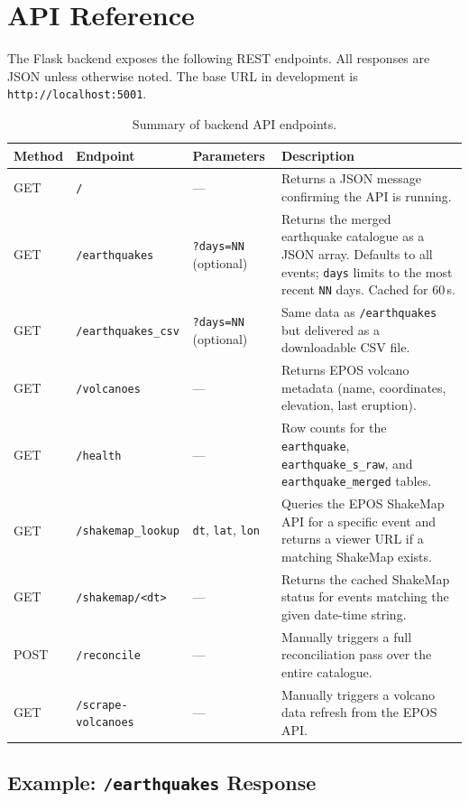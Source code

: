 \documentclass[12pt]{article}
\begin{document}
\clearpage
\section{API Reference}
\label{app:api}

The Flask backend exposes the following REST endpoints. All responses are JSON unless otherwise noted. The base URL in development is \texttt{http://localhost:5001}.

\begin{table}[H]
\centering
\small
\begin{tabular}{l l l p{5.5cm}}
\hline
\textbf{Method} & \textbf{Endpoint} & \textbf{Parameters} & \textbf{Description} \\
\hline
GET & \texttt{/} & --- & Returns a JSON message confirming the API is running. \\
GET & \texttt{/earthquakes} & \texttt{?days=NN} (optional) & Returns the merged earthquake catalogue as a JSON array. Defaults to all events; \texttt{days} limits to the most recent \texttt{NN} days. Cached for 60\,s. \\
GET & \texttt{/earthquakes\_csv} & \texttt{?days=NN} (optional) & Same data as \texttt{/earthquakes} but delivered as a downloadable CSV file. \\
GET & \texttt{/volcanoes} & --- & Returns EPOS volcano metadata (name, coordinates, elevation, last eruption). \\
GET & \texttt{/health} & --- & Row counts for the \texttt{earthquake}, \texttt{earthquake\_s\_raw}, and \texttt{earthquake\_merged} tables. \\
GET & \texttt{/shakemap\_lookup} & \texttt{dt}, \texttt{lat}, \texttt{lon} & Queries the EPOS ShakeMap API for a specific event and returns a viewer URL if a matching ShakeMap exists. \\
GET & \texttt{/shakemap/<dt>} & --- & Returns the cached ShakeMap status for events matching the given date-time string. \\
POST & \texttt{/reconcile} & --- & Manually triggers a full reconciliation pass over the entire catalogue. \\
GET & \texttt{/scrape-volcanoes} & --- & Manually triggers a volcano data refresh from the EPOS API. \\
\hline
\end{tabular}
\caption{Summary of backend API endpoints.}
\label{tab:api-endpoints}
\end{table}

\subsection*{Example: \texttt{/earthquakes} Response}
\end{document}
